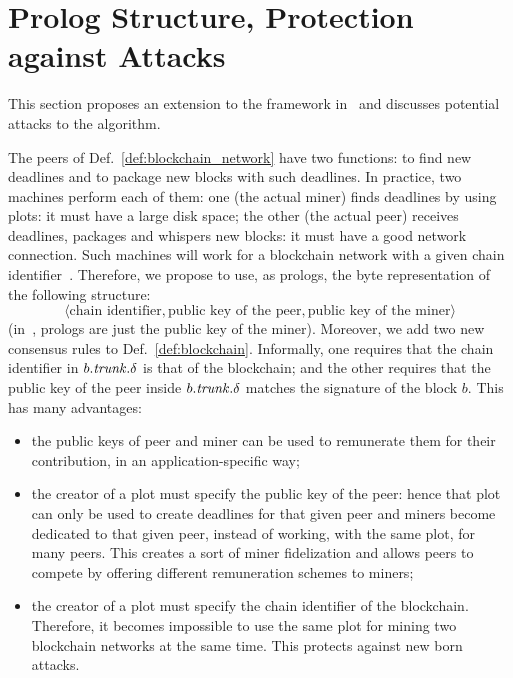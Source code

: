\section{Prolog Structure, Protection against Attacks}\label{sec:prolog_structure_attacks}
%
This section proposes an extension to the framework in~\cite{SignumPlotting} and
discusses potential attacks to the algorithm.

The peers of Def.~\ref{def:blockchain_network} have two functions: to find new deadlines and to
package new blocks with such deadlines. In practice, two machines perform each of them:
one (the actual miner) finds deadlines by using plots: it must have a large disk space; the other (the actual peer)
receives deadlines, packages and whispers new blocks: it must have a good network connection.
Such machines will work for a blockchain network with a given chain identifier~\cite{Antonopoulos17}.
Therefore, we propose to use, as prologs, the byte representation of the following structure:
\[
\langle\text{chain identifier},\text{public key of the peer},\text{public key of the miner}\rangle
\]
(in~\cite{SignumPlotting}, prologs are just the public key of the miner).
Moreover, we add two new consensus rules to Def.~\ref{def:blockchain}. Informally, one requires
that the chain identifier in $b.{\mathit{trunk}}.\delta$ is that of the blockchain; and the other requires that
the public key of the peer inside $b.{\mathit{trunk}}.\delta$ matches the signature of the block $b$. This has many advantages:
%
\begin{itemize}
\item the public keys of peer and miner can be used to remunerate them for their contribution,
  in an application-specific way;
\item the creator of a plot must specify the public key of the peer: hence that plot
  can only be used to create deadlines for that given peer and miners become dedicated to that given
  peer, instead of working, with the same plot, for many peers. This creates a sort of miner
  fidelization and allows peers to compete by offering different remuneration schemes to miners;
\item the creator of a plot must specify the chain identifier of the blockchain.
  Therefore, it becomes impossible to use the same plot for mining two
  blockchain networks at the same time. This protects against new born attacks.
\end{itemize}

